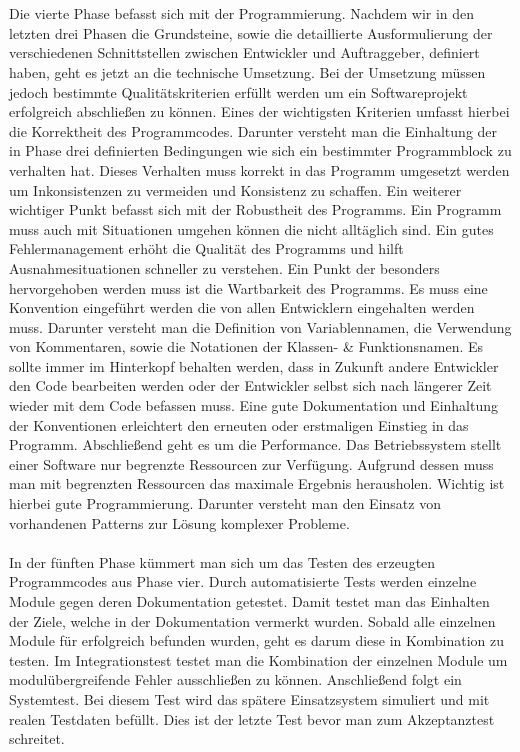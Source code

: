 \documentclass{llncs}
\begin{document}
\\ \\
Die vierte Phase befasst sich mit der Programmierung. Nachdem wir in den letzten drei Phasen die Grundsteine, sowie die detaillierte Ausformulierung der verschiedenen Schnittstellen zwischen Entwickler und Auftraggeber, definiert haben, geht es jetzt an die technische Umsetzung. Bei der Umsetzung müssen jedoch bestimmte Qualitätskriterien erfüllt werden um ein Softwareprojekt erfolgreich abschließen zu können. Eines der wichtigsten Kriterien umfasst hierbei die Korrektheit des Programmcodes. Darunter versteht man die Einhaltung der in Phase drei definierten Bedingungen wie sich ein bestimmter Programmblock zu verhalten hat. Dieses Verhalten muss korrekt in das Programm umgesetzt werden um Inkonsistenzen zu vermeiden und Konsistenz zu schaffen. Ein weiterer wichtiger Punkt befasst sich mit der Robustheit des Programms. Ein Programm muss auch mit Situationen umgehen können die nicht alltäglich sind. Ein gutes Fehlermanagement erhöht die Qualität des Programms und hilft Ausnahmesituationen schneller zu verstehen. Ein Punkt der besonders hervorgehoben werden muss ist die Wartbarkeit des Programms. Es muss eine Konvention eingeführt werden die von allen Entwicklern eingehalten werden muss. Darunter versteht man die Definition von Variablennamen, die Verwendung von Kommentaren, sowie die Notationen der Klassen- \& Funktionsnamen. Es sollte immer im Hinterkopf behalten werden, dass in Zukunft andere Entwickler den Code bearbeiten werden oder der Entwickler selbst sich nach längerer Zeit wieder mit dem Code befassen muss. Eine gute Dokumentation und Einhaltung der Konventionen erleichtert den erneuten oder erstmaligen Einstieg in das Programm. Abschließend geht es um die Performance. Das Betriebssystem stellt einer Software nur begrenzte Ressourcen zur Verfügung. Aufgrund dessen muss man mit begrenzten Ressourcen das maximale Ergebnis herausholen. Wichtig ist hierbei gute Programmierung. Darunter versteht man den Einsatz von vorhandenen Patterns zur Lösung komplexer Probleme.
\\ \\
In der fünften Phase kümmert man sich um das Testen des erzeugten Programmcodes aus Phase vier. Durch automatisierte Tests werden einzelne Module gegen deren Dokumentation getestet. Damit testet man das Einhalten der Ziele, welche in der Dokumentation vermerkt wurden. Sobald alle einzelnen Module für erfolgreich befunden wurden, geht es darum diese in Kombination zu testen. Im Integrationstest testet man die Kombination der einzelnen Module um modulübergreifende Fehler ausschließen zu können. Anschließend folgt ein Systemtest. Bei diesem Test wird das spätere Einsatzsystem simuliert und mit realen Testdaten befüllt. Dies ist der letzte Test bevor man zum Akzeptanztest schreitet. 
\end{document}
